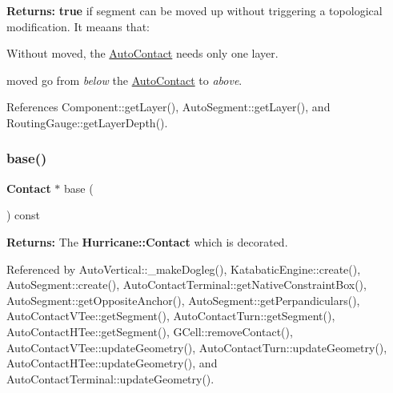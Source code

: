 {\bfseries Returns\+:} {\bfseries true} if {\ttfamily segment} can be moved up without triggering a topological modification. It meaans that\+:
\begin{DoxyItemize}
\item Without {\ttfamily moved}, the \hyperlink{classKatabatic_1_1AutoContact}{Auto\+Contact} needs only one layer.
\item {\ttfamily moved} go from {\itshape below} the \hyperlink{classKatabatic_1_1AutoContact}{Auto\+Contact} to {\itshape above}. 
\end{DoxyItemize}

References Component\+::get\+Layer(), Auto\+Segment\+::get\+Layer(), and Routing\+Gauge\+::get\+Layer\+Depth().

\mbox{\label{classKatabatic_1_1AutoContact_ab422116c7edfacedd31711c96e3ec95b}} 
\subsubsection{\texorpdfstring{base()}{base()}}
{\footnotesize\ttfamily \textbf{ Contact} $\ast$ base (\begin{DoxyParamCaption}{ }\end{DoxyParamCaption}) const\hspace{0.3cm}{\ttfamily [inline]}}

{\bfseries Returns\+:} The \textbf{ Hurricane\+::\+Contact} which is decorated. 

Referenced by Auto\+Vertical\+::\+\_\+make\+Dogleg(), Katabatic\+Engine\+::create(), Auto\+Segment\+::create(), Auto\+Contact\+Terminal\+::get\+Native\+Constraint\+Box(), Auto\+Segment\+::get\+Opposite\+Anchor(), Auto\+Segment\+::get\+Perpandiculars(), Auto\+Contact\+V\+Tee\+::get\+Segment(), Auto\+Contact\+Turn\+::get\+Segment(), Auto\+Contact\+H\+Tee\+::get\+Segment(), G\+Cell\+::remove\+Contact(), Auto\+Contact\+V\+Tee\+::update\+Geometry(), Auto\+Contact\+Turn\+::update\+Geometry(), Auto\+Contact\+H\+Tee\+::update\+Geometry(), and Auto\+Contact\+Terminal\+::update\+Geometry().

\mbox{\label{classKatabatic_1_1AutoContact_a91c8bc1a6bdb1b15c3c084ebfd38af47}} 
